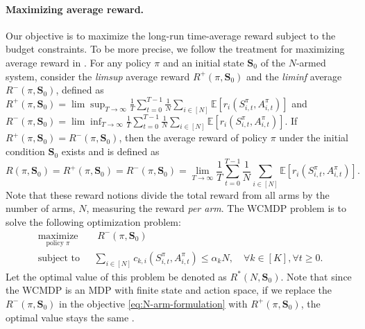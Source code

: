 \documentclass{article}
\theoremstyle{plain}
\theoremstyle{remark}
\newcommand{\E}[1]{\mathbb{E}\left[#1\right]}
\begin{document}
\paragraph{Maximizing average reward.}
Our objective is to maximize the long-run time-average reward subject to the budget constraints.
To be more precise, we follow the treatment for maximizing average reward in \citep{Put_05}. 
For any policy $\pi$ and an initial state $\bm{S}_0$ of the $N$-armed system, 
consider the \emph{limsup} average reward $R^+(\pi,\bm{S}_0)$ and the \emph{liminf} average  $R^-(\pi,\bm{S}_0)$, defined as $R^+(\pi,\bm{S}_0)=\lim\sup_{T\to\infty}\frac{1}{T}\sum_{t=0}^{T-1}\frac{1}{N}\sum_{i\in[N]}\E{r_i(S_{i,t}^\pi, A_{i,t}^\pi)}$ and $R^-(\pi,\bm{S}_0)=\lim\inf_{T\to\infty}\frac{1}{T}\sum_{t=0}^{T-1}\frac{1}{N}\sum_{i\in[N]}\E{r_i(S_{i,t}^\pi, A_{i,t}^\pi)}$. 
If $R^+(\pi,\bm{S}_0)=R^-(\pi,\bm{S}_0)$, then the average reward of policy $\pi$ under the initial condition $\bm{S}_0$ exists and is defined as
\begin{equation}
    R(\pi,\bm{S}_0) = R^+(\pi,\bm{S}_0) = R^-(\pi,\bm{S}_0)=\lim_{T\to\infty}\frac{1}{T}\sum_{t=0}^{T-1}\frac{1}{N}\sum_{i\in[N]}\E{r_i(S_{i,t}^\pi, A_{i,t}^\pi)}.
\end{equation}
Note that these reward notions divide the total reward from all arms by the number of arms, $N$, measuring the reward \emph{per arm}.
The WCMDP problem is to solve the following optimization problem:
\begin{subequations}\label{eq:WCMDP}
\begin{align}
    \label{eq:N-arm-formulation} 
    \underset{\text{policy } \pi}{\text{maximize}} &\quad R^-(\pi,\bm{S}_0)\\
    \text{subject to}  
    &\mspace{12mu}  \sum_{i\in[N]} c_{k,i}(S_{i,t}^\pi, A_{i,t}^\pi)\le \alpha_k N,\quad \forall k\in[K],\forall t\ge 0. \label{eq:hard-budget-constraint}
\end{align}
\end{subequations}
Let the optimal value of this problem be denoted as $R^*(N,\bm{S}_0)$.
Note that since the WCMDP is an MDP with finite state and action space, if we replace the $R^-(\pi,\bm{S}_0)$ in the objective \eqref{eq:N-arm-formulation} with $R^+(\pi,\bm{S}_0)$, the optimal value stays the same \citep[Proposition 9.1.6]{Put_05}. 
\end{document}
